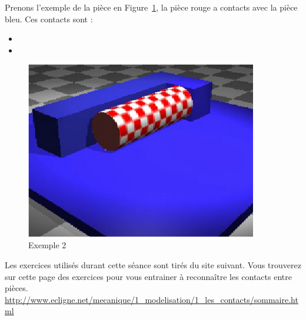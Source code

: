 \documentclass[10pt,fleqn,draft]{article} %
\begin{document}
\begin{exemple}
  Prenons l'exemple de la pièce en Figure~\ref{fig:exemple2}, la pièce rouge a  contacts avec la pièce bleu. Ces contacts sont :

  \begin{itemize}
    \item {}
    \item {}
  \end{itemize}
\end{exemple}
\begin{figure}[h]
  \centering
  \includegraphics[width=0.9\textwidth,height=.2\textheight,keepaspectratio]{images/2lineique_1ponctuel}
  \caption{Exemple 2}
  \label{fig:exemple2}
\end{figure}

\begin{remark}
  Les exercices utilisés durant cette séance sont tirés du site suivant. Vous trouverez sur cette page des exercices pour vous entrainer à reconnaître les contacts entre pièces.\\
  \url{http://www.ecligne.net/mecanique/1_modelisation/1_les_contacts/sommaire.html}
\end{remark}
\end{document}
